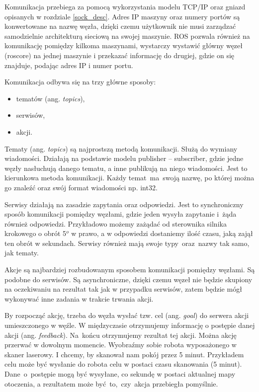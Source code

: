 {{        Komunikacja przebiega za pomocą wykorzystania modelu TCP/IP \cite{tcpip} oraz gniazd opisanych w rozdziale \ref{sock_desc}. Adres IP maszyny oraz numery portów są konwertowane na nazwę węzła, dzięki czemu użytkownik nie musi zarządzać samodzielnie architekturą sieciową na swojej maszynie. ROS pozwala również na komunikację pomiędzy kilkoma maszynami, wystarczy wystawić główny węzeł (roscore) na jednej maszynie i przekazać informację do drugiej, gdzie on się znajduje, podając adres IP i numer portu.
        
        Komunikacja odbywa się na trzy główne sposoby:
        \begin{itemize}
            \item tematów (ang. \textit{topics}),
            \item serwisów,
            \item akcji.
        \end{itemize}
        
        Tematy (ang. \textit{topics}) \cite{ros_topics} są najprostszą metodą komunikacji. Służą do wymiany wiadomości. Działają na podstawie modelu publisher -- subscriber, gdzie jedne węzły nasłuchują danego tematu, a inne publikują na niego wiadomości. Jest to kierunkowa metoda komunikacji. Każdy temat~ma~swoją nazwę, po której można go znaleźć oraz swój format wiadomości np. int32.

        Serwisy \cite{ros_services} działają na zasadzie zapytania oraz odpowiedzi. Jest to  synchroniczny sposób komunikacji pomiędzy węzłami, gdzie jeden wysyła zapytanie i~żąda również odpowiedzi. Przykładowo możemy zażądać od sterownika silnika krokowego o obrót 5$^o$ w prawo, a w odpowiedzi dostaniemy ilość czasu, jaką zajął ten obrót w sekundach. Serwisy również mają swoje typy~oraz~nazwy tak samo, jak tematy.
        
        Akcje \cite{ros_actionlib} są najbardziej rozbudowanym sposobem komunikacji pomiędzy węzłami. Są podobne do serwisów. Są asynchroniczne, dzięki czemu węzeł nie będzie skupiony na oczekiwaniu na rezultat tak jak w przypadku serwisów, zatem będzie mógł wykonywać inne zadania w trakcie trwania akcji.
        
        By rozpocząć akcję, trzeba do węzła wysłać tzw. cel (ang. \textit{goal}) do serwera akcji umieszczonego w węźle. W międzyczasie otrzymujemy informację o postępie danej akcji (ang. \textit{feedback}). Na~końcu otrzymujemy rezultat tej akcji. Można akcję przerwać w dowolnym momencie. Wyobraźmy sobie robota wyposażonego w skaner laserowy. I chcemy, by skanował nam pokój przez 5 minut. Przykładem celu może być wysłanie do robota celu w postaci czasu skanowania (5 minut). Dane~o~postępie mogą być wysyłane, co sekundę w postaci aktualnej mapy otoczenia, a rezultatem może być~to,~czy~akcja przebiegła pomyślnie.
        
}}
